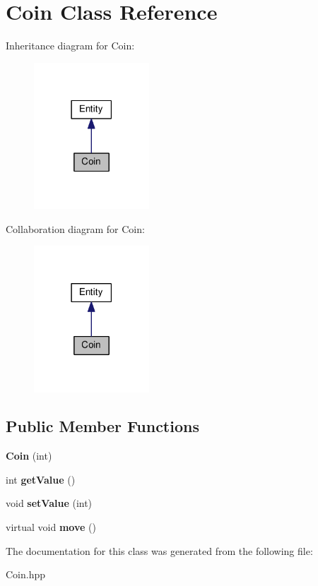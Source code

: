 \hypertarget{classCoin}{}\section{Coin Class Reference}
\label{classCoin}


Inheritance diagram for Coin\+:
\nopagebreak
\begin{figure}[H]
\begin{center}
\leavevmode
\includegraphics[width=122pt]{classCoin__inherit__graph}
\end{center}
\end{figure}


Collaboration diagram for Coin\+:
\nopagebreak
\begin{figure}[H]
\begin{center}
\leavevmode
\includegraphics[width=122pt]{classCoin__coll__graph}
\end{center}
\end{figure}
\subsection*{Public Member Functions}
\begin{DoxyCompactItemize}
\item 
\mbox{\label{classCoin_aa6bd6ccd1fe41c519112b077e54a603a}} 
{\bfseries Coin} (int)
\item 
\mbox{\label{classCoin_a1e51e734f8cbd7366e4376d9e3439d9e}} 
int {\bfseries get\+Value} ()
\item 
\mbox{\label{classCoin_a000679bc7222f8ee0c0be74e920005a1}} 
void {\bfseries set\+Value} (int)
\item 
\mbox{\label{classCoin_a152d094662ff9b2ed44af94f11241856}} 
virtual void {\bfseries move} ()
\end{DoxyCompactItemize}


The documentation for this class was generated from the following file\+:\begin{DoxyCompactItemize}
\item 
Coin.\+hpp\end{DoxyCompactItemize}
